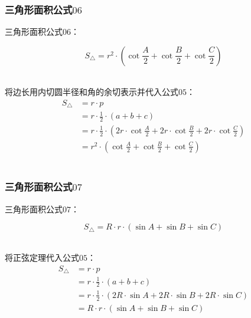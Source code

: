 \documentclass[UTF8]{ctexart}
\begin{document}
\newpage

\subsubsection{三角形面积公式$06$}
    三角形面积公式$06$：
    \begin{large}
        \begin{equation*}
            S_{\triangle}=r^2\cdot\left(\cot{\frac{A}{2}}+\cot{\frac{B}{2}}+\cot{\frac{C}{2}}\right)
        \end{equation*}
    \end{large}\\
    将边长用内切圆半径和角的余切表示并代入公式$05$：
    \begin{align}
        S_{\triangle}
        &=r\cdot p\\[3mm]
        &=r\cdot\frac{1}{2}\cdot(a+b+c)\\[3mm]
        &=r\cdot\frac{1}{2}\cdot\left(2r\cdot\cot{\frac{A}{2}}+2r\cdot\cot{\frac{B}{2}}+2r\cdot\cot{\frac{C}{2}}\right)\\[3mm]
        &=r^2\cdot\left(\cot{\frac{A}{2}}+\cot{\frac{B}{2}}+\cot{\frac{C}{2}}\right)
    \end{align}\\

\subsubsection{三角形面积公式$07$}
    三角形面积公式$07$：
    \begin{large}
        \begin{equation*}
            S_{\triangle}=R\cdot r\cdot(\sin{A}+\sin{B}+\sin{C})
        \end{equation*}
    \end{large}\\
    将正弦定理代入公式$05$：
    \setcounter{equation}{0}
    \begin{align}
        S_{\triangle}
        &=r\cdot p\\[3mm]
        &=r\cdot\frac{1}{2}\cdot(a+b+c)\\[3mm]
        &=r\cdot\frac{1}{2}\cdot(2R\cdot\sin{A}+2R\cdot\sin{B}+2R\cdot\sin{C})\\[3mm]
        &=R\cdot r\cdot(\sin{A}+\sin{B}+\sin{C})
    \end{align}

\newpage
\end{document}
